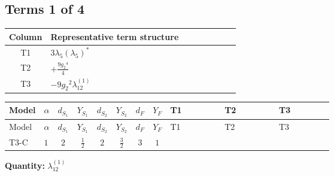 \documentclass[8pt]{article}
\begin{document}
\begin{landscape}
\subsection*{Terms 1 of 4}
\begin{center}
\begin{tabular}{@{}c >{\raggedright\arraybackslash}p{0.82\linewidth}@{}}
\toprule
Column & Representative term structure \\
\midrule
T1 & \(\displaystyle 3 {\lambda_5} \left({\lambda_5}\right)^{*}\) \\
\midrule
T2 & \(\displaystyle +\frac{9 {g_2}^4}{4}\) \\
\midrule
T3 & \(\displaystyle -9 {g_2}^2 {\lambda_{12}^{(1)}}\) \\
\midrule
\bottomrule
\end{tabular}
\end{center}
\smallskip
\tiny
\begin{longtable}{@{}llcccccc >{\raggedright\arraybackslash}p{0.21\linewidth} >{\raggedright\arraybackslash}p{0.21\linewidth} >{\raggedright\arraybackslash}p{0.21\linewidth}@{}}
\toprule
Model & $\alpha$ & $d_{S_1}$ & $Y_{S_1}$ & $d_{S_2}$ & $Y_{S_2}$ & $d_F$ & $Y_F$ & T1 & T2 & T3 \\
\midrule
\endfirsthead
\toprule
Model & $\alpha$ & $d_{S_1}$ & $Y_{S_1}$ & $d_{S_2}$ & $Y_{S_2}$ & $d_F$ & $Y_F$ & T1 & T2 & T3 \\
\midrule
\endhead
T3-C & $1$ & $2$ & $\frac{1}{2}$ & $2$ & $\frac{3}{2}$ & $3$ & $1$ & \scriptsize\adjustbox{max width=\linewidth}{$\begin{gathered} 3 {\lambda_5} \left({\lambda_5}\right)^{*}\end{gathered}$} & \scriptsize\adjustbox{max width=\linewidth}{$\begin{gathered} +\frac{9 {g_2}^4}{4}\end{gathered}$} & \scriptsize\adjustbox{max width=\linewidth}{$\begin{gathered} -9 {g_2}^2 {\lambda_{12}^{(1)}}\end{gathered}$} \\
\midrule
\bottomrule
\end{longtable}
\clearpage
\noindent\textbf{Quantity: }$\lambda_{12}^{(1)}$\par\smallskip

\end{landscape}
\end{document}
